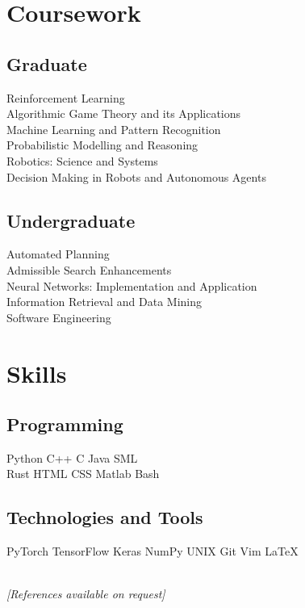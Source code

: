 \documentclass[]{deedy-resume}
\begin{document}
\begin{minipage}[t]{0.33\textwidth}

\section{Coursework}
\subsection{Graduate}
Reinforcement Learning \\
Algorithmic Game Theory and its Applications \\
Machine Learning and Pattern Recognition \\
Probabilistic Modelling and Reasoning \\
Robotics: Science and Systems \\
Decision Making in Robots and Autonomous Agents \\
\sectionsep

\subsection{Undergraduate}
Automated Planning \\
Admissible Search Enhancements \\
Neural Networks: Implementation and Application \\
Information Retrieval and Data Mining \\
Software Engineering \\
\sectionsep


\section{Skills}
\subsection{Programming}
Python \textbullet{} C++ \textbullet{} C \textbullet{} Java \textbullet{} SML
\ \vspace{0.3em} \\
Rust \textbullet{} HTML \textbullet{} CSS \textbullet{} Matlab \textbullet{} Bash \\
\sectionsep

\subsection{Technologies and Tools}
PyTorch \textbullet{} TensorFlow \textbullet{} Keras \textbullet{} NumPy \textbullet{} UNIX \textbullet{} Git \textbullet{} Vim \textbullet{} \LaTeX

\ \\
\small \textit{[References available on request]}

%
%

\end{minipage} 
\end{document}
